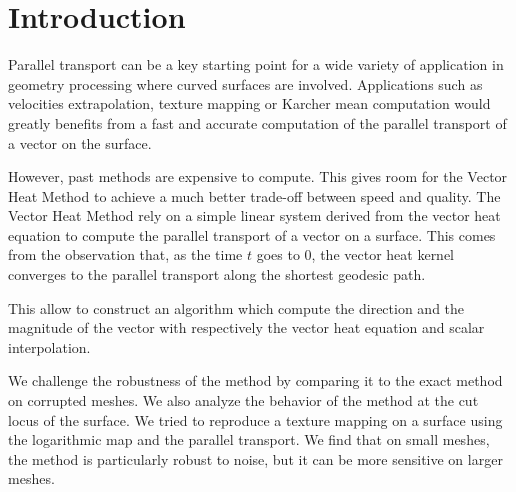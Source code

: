 \documentclass[sigconf]{acmart}
\begin{document}



\maketitle

\section{Introduction}
Parallel transport can be a key starting point for a wide variety of application in geometry processing where curved surfaces are involved. Applications such as velocities extrapolation, texture mapping or Karcher mean computation would greatly benefits from a fast and accurate computation of the parallel transport of a vector on the surface.

However, past methods are expensive to compute. This gives room for the Vector Heat Method \cite{Sharp:2019:VHM} to achieve a much better trade-off between speed and quality. The Vector Heat Method rely on a simple linear system derived from the vector heat equation to compute the parallel transport of a vector on a surface. This comes from the observation that, as the time $t$ goes to 0, the vector heat kernel converges to the parallel transport along the shortest geodesic path.

This allow to construct an algorithm which compute the direction and the magnitude of the vector with respectively the vector heat equation and scalar interpolation.

We challenge the robustness of the method by comparing it to the exact method on corrupted meshes. We also analyze the behavior of the method at the cut locus of the surface. We tried to reproduce a texture mapping on a surface using the logarithmic map and the parallel transport.
We find that on small meshes, the method is particularly robust to noise, but it can be more sensitive on larger meshes.
\end{document}
